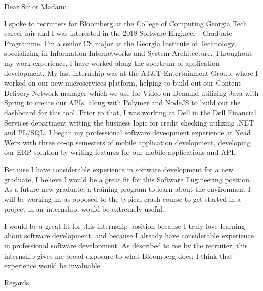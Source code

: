 \documentclass{letter}
\begin{document}
\begin{letter}{}
\opening{Dear Sir or Madam:}

	I spoke to recruiters for Bloomberg at the College of Computing Georgia Tech career fair and I was interested in the 2018 Software Engineer - Graduate Programme. I'm a senior CS major at the Georgia Institute of Technology, specializing in Information Internetworks and System Architecture. Throughout my work experience, I have worked along the spectrum of application development. My last internship was at the AT\&T Entertainment Group, where I worked on our new microservices platform, helping to build out our Content Delivery Network manager which we use for Video on Demand utilizing Java with Spring to create our APIs, along with Polymer and NodeJS to build out the dashboard for this tool. Prior to that, I was working at Dell in the Dell Financial Services department writing the business logic for credit checking utilizing .NET and PL/SQL. I began my professional software deveopment experience at Nead Werx with three co-op semesters of mobile application development, developing our ERP solution by writing features for our mobile applications and API.

	Because I have considerable experience in software development for a new graduate, I believe I would be a great fit for this Software Engineering position. As a future new graduate, a training program to learn about the environment I will be working in, as opposed to the typical crash course to get started in a project in an internship, would be extremely useful.

	I would be a great fit for this internship position because I truly love learning about software development, and because I already have considerable experience in professional software development.  As described to me by the recruiter, this internship gives me broad exposure to what Bloomberg does; I think that experience would be invaluable.


\closing{Regards,}
\end{letter}
\end{document}
